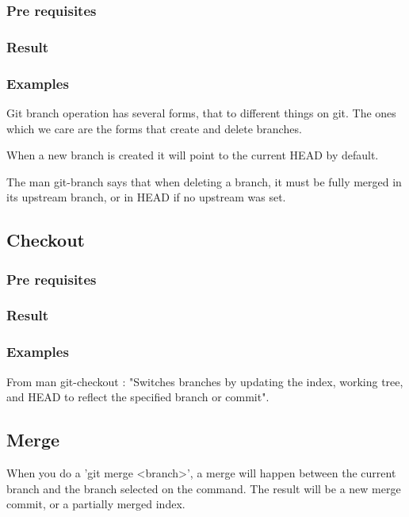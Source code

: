 \subsubsection{Pre requisites}

\subsubsection{Result}

\subsubsection{Examples}
Git branch operation has several forms, that to different things on git.
The ones which we care are the forms that create and delete branches. \par
When a new branch is created it will point to the current HEAD by default.
\par


The man git-branch says that when deleting a branch, it must be fully
merged in its upstream branch, or in HEAD if no upstream was set. \par


\subsection{Checkout}

\subsubsection{Pre requisites}

\subsubsection{Result}

\subsubsection{Examples}
From man git-checkout : "Switches branches by updating the index, 
working tree, and HEAD to reflect the specified branch or commit". \par

\subsection{Merge}


When you do a 'git merge <branch>', a merge will happen between the current
branch and the branch selected on the command. The result will be a new merge 
commit, or a partially merged index. \par

